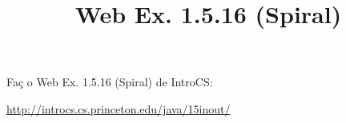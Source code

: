 \documentclass{article}
\title{Web Ex. 1.5.16 (Spiral)}
\date{}
\author{}
\begin{document}
\maketitle

Fa\c{c} o Web Ex. 1.5.16 (Spiral) de IntroCS:

\url{http://introcs.cs.princeton.edu/java/15inout/}
\end{document}

